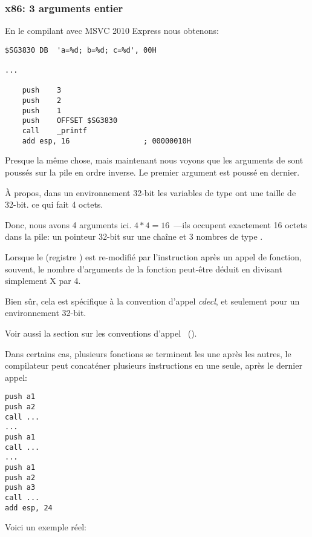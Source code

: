 \subsubsection{x86: 3 arguments entier}


En le compilant avec MSVC 2010 Express nous obtenons:

\begin{lstlisting}[style=customasmx86]
$SG3830	DB	'a=%d; b=%d; c=%d', 00H

...

	push	3
	push	2
	push	1
	push	OFFSET $SG3830
	call	_printf
	add	esp, 16					; 00000010H
\end{lstlisting}

Presque la même chose, mais maintenant nous voyons que les arguments de \printf sont
poussés sur la pile en ordre inverse. Le premier argument est poussé en dernier.

À propos, dans un environnement 32-bit les variables de type \Tint ont une taille
de 32-bit. ce qui fait 4 octets.

Donc, nous avons 4 arguments ici. $4*4 = 16$~---ils occupent exactement 16 octets
dans la pile: un pointeur 32-bit sur une chaîne et 3 nombres de type \Tint.

Lorsque le  (registre \ESP) est re-modifié
par l'instruction  après un appel de fonction, souvent, le nombre
d'arguments de la fonction peut-être déduit en divisant simplement X par 4.

Bien sûr, cela est spécifique à la convention d'appel \emph{cdecl}, et seulement
pour un environnement 32-bit.

Voir aussi la section sur les conventions d'appel ~().

Dans certains cas, plusieurs fonctions se terminent les une après les autres, le
compilateur peut concaténer plusieurs instructions  en une seule,
après le dernier appel:

\begin{lstlisting}[style=customasmx86]
push a1
push a2
call ...
...
push a1
call ...
...
push a1
push a2
push a3
call ...
add esp, 24
\end{lstlisting}

Voici un exemple réel:



